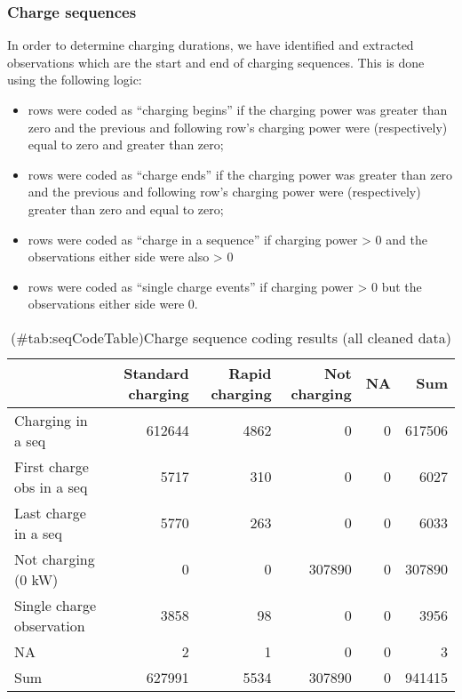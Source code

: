 \documentclass[]{article}
\providecommand{\tightlist}{%
  \setlength{\itemsep}{0pt}\setlength{\parskip}{0pt}}
\begin{document}
\hypertarget{codeSequences}{%
\subsubsection{Charge sequences}\label{codeSequences}}

In order to determine charging durations, we have identified and extracted observations which are the start and end of charging sequences. This is done using the following logic:

\begin{itemize}
\tightlist
\item
  rows were coded as ``charging begins'' if the charging power was greater than zero and the previous and following row's charging power were (respectively) equal to zero and greater than zero;
\item
  rows were coded as ``charge ends'' if the charging power was greater than zero and the previous and following row's charging power were (respectively) greater than zero and equal to zero;
\item
  rows were coded as ``charge in a sequence'' if charging power \textgreater{} 0 and the observations either side were also \textgreater{} 0
\item
  rows were coded as ``single charge events'' if charging power \textgreater{} 0 but the observations either side were 0.
\end{itemize}

\begin{table}[t]

\caption{(\#tab:seqCodeTable)Charge sequence coding results (all cleaned data)}
\centering
\begin{tabular}{l|r|r|r|r|r}
\hline
  & Standard charging & Rapid charging & Not charging & NA & Sum\\
\hline
Charging in a seq & 612644 & 4862 & 0 & 0 & 617506\\
\hline
First charge obs in a seq & 5717 & 310 & 0 & 0 & 6027\\
\hline
Last charge in a seq & 5770 & 263 & 0 & 0 & 6033\\
\hline
Not charging (0 kW) & 0 & 0 & 307890 & 0 & 307890\\
\hline
Single charge observation & 3858 & 98 & 0 & 0 & 3956\\
\hline
NA & 2 & 1 & 0 & 0 & 3\\
\hline
Sum & 627991 & 5534 & 307890 & 0 & 941415\\
\hline
\end{tabular}
\end{table}
\end{document}
